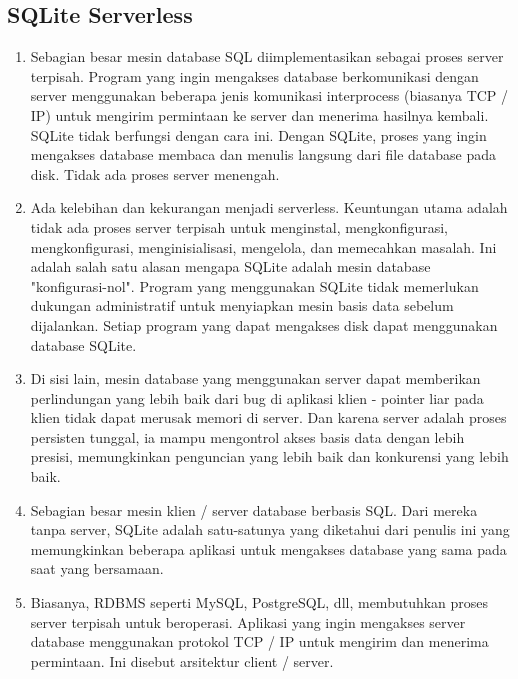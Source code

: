 \begin{enumerate}
	\subsection{SQLite Serverless}
		\begin{enumerate}
			\item Sebagian besar mesin database SQL diimplementasikan sebagai proses server terpisah. Program yang ingin mengakses database berkomunikasi dengan server menggunakan beberapa jenis komunikasi interprocess (biasanya TCP / IP) untuk mengirim permintaan ke server dan menerima hasilnya kembali. SQLite tidak berfungsi dengan cara ini. Dengan SQLite, proses yang ingin mengakses database membaca dan menulis langsung dari file database pada disk. Tidak ada proses server menengah.
			\item Ada kelebihan dan kekurangan menjadi serverless. Keuntungan utama adalah tidak ada proses server terpisah untuk menginstal, mengkonfigurasi, mengkonfigurasi, menginisialisasi, mengelola, dan memecahkan masalah. Ini adalah salah satu alasan mengapa SQLite adalah mesin database "konfigurasi-nol". Program yang menggunakan SQLite tidak memerlukan dukungan administratif untuk menyiapkan mesin basis data sebelum dijalankan. Setiap program yang dapat mengakses disk dapat menggunakan database SQLite.
			\item Di sisi lain, mesin database yang menggunakan server dapat memberikan perlindungan yang lebih baik dari bug di aplikasi klien - pointer liar pada klien tidak dapat merusak memori di server. Dan karena server adalah proses persisten tunggal, ia mampu mengontrol akses basis data dengan lebih presisi, memungkinkan penguncian yang lebih baik dan konkurensi yang lebih baik.
			\item Sebagian besar mesin klien / server database berbasis SQL. Dari mereka tanpa server, SQLite adalah satu-satunya yang diketahui dari penulis ini yang memungkinkan beberapa aplikasi untuk mengakses database yang sama pada saat yang bersamaan.
			\item Biasanya, RDBMS seperti MySQL, PostgreSQL, dll, membutuhkan proses server terpisah untuk beroperasi. Aplikasi yang ingin mengakses server database menggunakan protokol TCP / IP untuk mengirim dan menerima permintaan. Ini disebut arsitektur client / server.
		\end{enumerate}

\end{enumerate}
